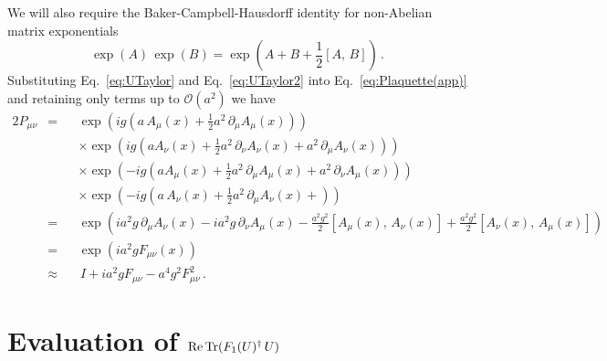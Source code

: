 We will also require the Baker-Campbell-Hausdorff identity for non-Abelian matrix exponentials
%
\begin{equation}
\exp(A)\,\exp(B) = \exp\left(A + B +\frac{1}{2}[A,\,B]\right)\, .
\end{equation}
%
Substituting Eq.~\ref{eq:UTaylor} and Eq.~\ref{eq:UTaylor2} into Eq.~\ref{eq:Plaquette(app)} and retaining only terms up to $\mathcal{O}(a^2)$ we have
%
\begin{alignat*}{2}
P_{\mu\nu} &= &&\exp\left(ig\left(a\,A_\mu(x)+\frac{1}{2}a^2\,\partial_\mu A_\mu(x) \right)\right)\\
& &&\times\exp\left(ig\left(aA_\nu(x) + \frac{1}{2}a^2\,\partial_\nu A_\nu(x) + a^2\,\partial_\mu A_\nu(x)\right)\right)\\
& &&\times\exp\left(-ig\left(aA_\mu(x) + \frac{1}{2}a^2\,\partial_\mu A_\mu(x) + a^2\,\partial_\nu A_\mu(x)\right)\right)\\
& &&\times\exp\left(-ig\left(a\,A_\nu(x)+\frac{1}{2}a^2\,\partial_\mu A_\nu(x) + \right)\right)\\
&= &&\exp\left(ia^2g\,\partial_\mu A_\nu(x) - ia^2g\,\partial_\nu A_\mu(x) -\frac{a^2g^2}{2}[A_\mu(x),\,A_\nu(x)] + \frac{a^2g^2}{2}[A_\nu(x),\,A_\mu(x)]\right)\\
&= &&\exp\left(ia^2g F_{\mu\nu}(x)\right)\\
&\approx &&\, I + ia^2 g F_{\mu\nu} -a^4 g^2 F_{\mu\nu}^2\, .
\end{alignat*}

\chapter{Evaluation of $\operatorname{Re}\operatorname{Tr}(F_1(U)^\dagger \,U)$}\label{app:CoolingMaximise}

